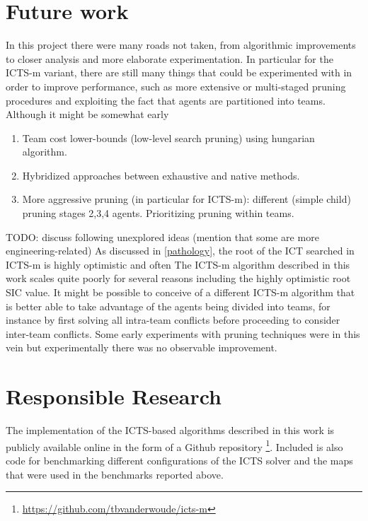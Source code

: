 \documentclass[english,10pt]{article}
\begin{document}
	\section{Future work}
	In this project there were many roads not taken, from algorithmic improvements to closer analysis and more elaborate experimentation. In particular for the ICTS-m variant, there are still many things that could be experimented with in order to improve performance, such as more extensive or multi-staged pruning procedures and exploiting the fact that agents are partitioned into teams. Although it might be somewhat early
	\begin{enumerate}
		\item Team cost lower-bounds (low-level search pruning) using hungarian algorithm.
		\item Hybridized approaches between exhaustive and native methods.
		\item More aggressive pruning (in particular for ICTS-m): different (simple child) pruning stages 2,3,4 agents. Prioritizing pruning within teams.
	\end{enumerate}
	
	TODO: discuss following unexplored ideas (mention that some are more engineering-related)
	As discussed in \ref{pathology}, the root of the ICT searched in ICTS-m is highly optimistic and often 
	The ICTS-m algorithm described in this work scales quite poorly for several reasons including the highly optimistic root SIC value. It might be possible to conceive of a different ICTS-m algorithm that is better able to take advantage of the agents being divided into teams, for instance by first solving all intra-team conflicts before proceeding to consider inter-team conflicts. Some early experiments with pruning techniques were in this vein but experimentally there was no observable improvement.
	\section{Responsible Research}
	The implementation of the ICTS-based algorithms described in this work is publicly available online in the form of a Github repository \footnote{\url{https://github.com/tbvanderwoude/icts-m}}. Included is also code for benchmarking different configurations of the ICTS solver and the maps that were used in the benchmarks reported above.
	
	\printbibliography
	
\end{document}
